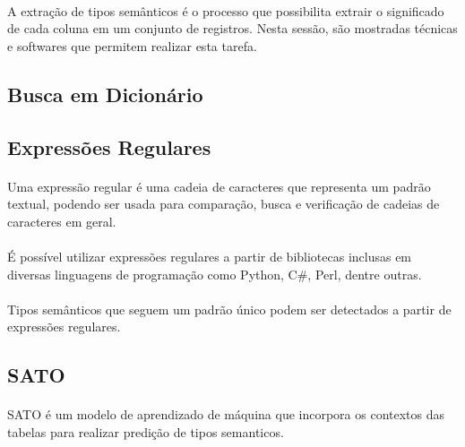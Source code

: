 \paragraph{} A extração de tipos semânticos é o processo que possibilita extrair o significado de cada coluna em um conjunto de registros.
Nesta sessão, são mostradas técnicas e softwares que permitem realizar esta tarefa.

\subsection{Busca em Dicionário}

\paragraph{} 

\subsection{Expressões Regulares}

\paragraph{} Uma expressão regular é uma cadeia de caracteres que representa um padrão textual\cite{goyvaerts2012regular}, podendo ser usada para comparação, busca e verificação de cadeias de caracteres em geral.

\paragraph{} É possível utilizar expressões regulares a partir de bibliotecas inclusas em diversas linguagens de programação como Python, C\#, Perl, dentre outras.

\paragraph{} Tipos semânticos que seguem um padrão único podem ser detectados a partir de expressões regulares.
 
\subsection{SATO}

\paragraph{} SATO\cite{zhang2019sato} é um modelo de aprendizado de máquina que incorpora os contextos das tabelas para realizar predição de tipos semanticos.

